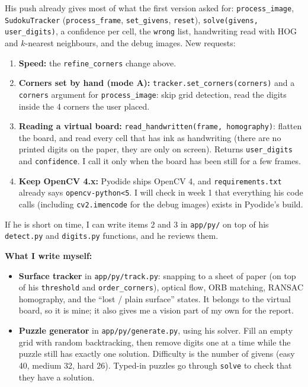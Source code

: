 \documentclass[11pt]{article}
\begin{document}
His push already gives most of what the first version asked for: \texttt{process\_image},
\texttt{SudokuTracker} (\texttt{process\_frame}, \texttt{set\_givens}, \texttt{reset}),
\texttt{solve(givens, user\_digits)}, a confidence per cell, the \texttt{wrong} list,
handwriting read with HOG and $k$-nearest neighbours, and the debug images. New requests:
\begin{enumerate}
  \item \textbf{Speed:} the \texttt{refine\_corners} change above.
  \item \textbf{Corners set by hand (mode A):} \texttt{tracker.set\_corners(corners)} and a
        \texttt{corners} argument for \texttt{process\_image}: skip grid detection, read the
        digits inside the 4 corners the user placed.
  \item \textbf{Reading a virtual board:} \texttt{read\_handwritten(frame, homography)}: flatten
        the board, and read every cell that has ink as handwriting (there are no printed digits on
        the paper, they are only on screen). Returns \texttt{user\_digits} and
        \texttt{confidence}. I call it only when the board has been still for a few frames.
  \item \textbf{Keep OpenCV 4.x:} Pyodide ships OpenCV 4, and \texttt{requirements.txt} already
        says \texttt{opencv-python<5}. I will check in week 1 that everything his code calls
        (including \texttt{cv2.imencode} for the debug images) exists in Pyodide's build.
\end{enumerate}
If he is short on time, I can write items 2 and 3 in \texttt{app/py/} on top of his
\texttt{detect.py} and \texttt{digits.py} functions, and he reviews them.

\textbf{What I write myself:}
\begin{itemize}
  \item \textbf{Surface tracker} in \texttt{app/py/track.py}: snapping to a sheet of paper (on top
        of his \texttt{threshold} and \texttt{order\_corners}), optical flow, ORB matching, RANSAC
        homography, and the ``lost / plain surface'' states. It belongs to the virtual board, so it
        is mine; it also gives me a vision part of my own for the report.
  \item \textbf{Puzzle generator} in \texttt{app/py/generate.py}, using his solver. Fill an empty grid with random backtracking, then remove digits one at a time
while the puzzle still has exactly one solution. Difficulty is the number of givens (easy 40,
medium 32, hard 26). Typed-in puzzles go through \texttt{solve} to check that they have a
        solution.
\end{itemize}
\end{document}
